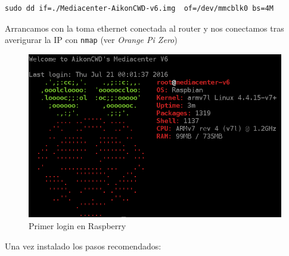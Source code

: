 \documentclass[12pt,spanish,]{scrartcl}
\begin{document}
\begin{verbatim}
sudo dd if=./Mediacenter-AikonCWD-v6.img  of=/dev/mmcblk0 bs=4M
\end{verbatim}

Arrancamos con la toma ethernet conectada al router y nos conectamos
tras averigurar la IP con \texttt{nmap} (ver \emph{Orange Pi Zero})

\begin{figure}[htbp]
\centering
\includegraphics{src/img/RaspiFirstLogin.png}
\caption{Primer login en Raspberry}
\end{figure}

Una vez instalado los pasos recomendados:
\end{document}
